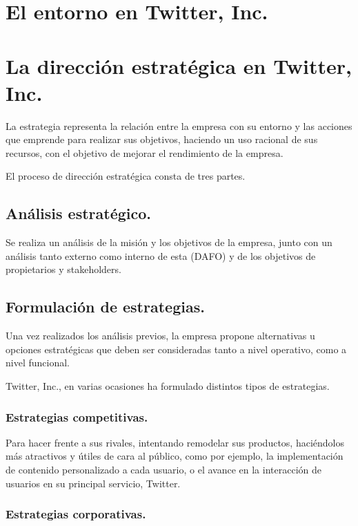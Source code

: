 
\section{El entorno en Twitter, Inc.}



\section{La dirección estratégica en Twitter, Inc.}

La estrategia representa la relación entre la empresa con su entorno y las acciones que emprende para realizar sus objetivos, haciendo un uso racional de sus recursos, con el objetivo de mejorar el rendimiento de la empresa.

El proceso de dirección estratégica consta de tres partes.

\subsection{Análisis estratégico.}

Se realiza un análisis de la misión y los objetivos de la empresa, junto con un análisis tanto externo como interno de esta (DAFO) y de los objetivos de propietarios y stakeholders.

\subsection{Formulación de estrategias.}

Una vez realizados los análisis previos, la empresa propone alternativas u opciones estratégicas  que deben ser consideradas tanto a nivel operativo, como a nivel funcional.

Twitter, Inc., en varias ocasiones ha formulado distintos tipos de estrategias.

\subsubsection{Estrategias competitivas.}

Para hacer frente a sus rivales, intentando remodelar sus productos, haciéndolos más atractivos y útiles de cara al público, como por ejemplo, la implementación de contenido personalizado a cada usuario, o el avance en la interacción de usuarios en su principal servicio, Twitter.

\subsubsection{Estrategias corporativas.}

